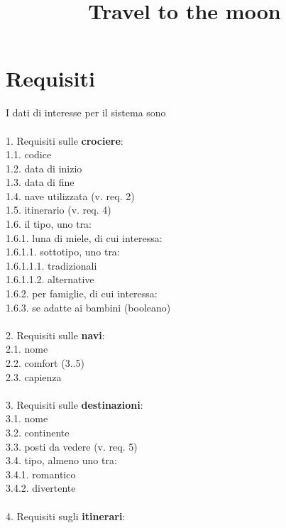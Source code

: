 \documentclass[12pt, letterpaper]{article}
\title{\textbf{Travel to the moon}}
\date{}
\newcommand{\acc}{\\\hphantom{}\\}
\begin{document}
\maketitle


\section{Requisiti}
I dati di interesse per il sistema sono \acc
1. Requisiti sulle \textbf{crociere}:\\
\hphantom{ident}1.1. codice \\
\hphantom{ident}1.2. data di inizio\\
\hphantom{ident}1.3. data di fine\\
\hphantom{ident}1.4. nave utilizzata (v. req. 2)\\
\hphantom{ident}1.5. itinerario (v. req. 4)\\
\hphantom{ident}1.6. il tipo, uno tra:\\
\hphantom{ident}\hphantom{ident}1.6.1. luna di miele, di cui interessa:\\
\hphantom{ident}\hphantom{ident}\hphantom{ident}1.6.1.1. sottotipo, uno tra:\\
\hphantom{ident}\hphantom{ident}\hphantom{ident}\hphantom{ident}1.6.1.1.1. tradizionali\\
\hphantom{ident}\hphantom{ident}\hphantom{ident}\hphantom{ident}1.6.1.1.2. alternative\\
\hphantom{ident}\hphantom{ident}\hphantom{ident}1.6.2. per famiglie, di cui interessa:\\
\hphantom{ident}\hphantom{ident}\hphantom{ident}\hphantom{ident}1.6.3. se adatte ai bambini (booleano)
\acc
2. Requisiti sulle \textbf{navi}:\\
\hphantom{ident}2.1. nome\\
\hphantom{ident}2.2. comfort (3..5)\\
\hphantom{ident}2.3. capienza\acc
3. Requisiti sulle \textbf{destinazioni}:\\
\hphantom{ident}3.1. nome\\
\hphantom{ident}3.2. continente\\
\hphantom{ident}3.3. posti da vedere (v. req. 5)\\
\hphantom{ident}3.4. tipo, almeno uno tra:\\
\hphantom{ident}\hphantom{ident}3.4.1. romantico\\
\hphantom{ident}\hphantom{ident}3.4.2. divertente
\acc
4. Requisiti sugli \textbf{itinerari}:\\
\end{document}
